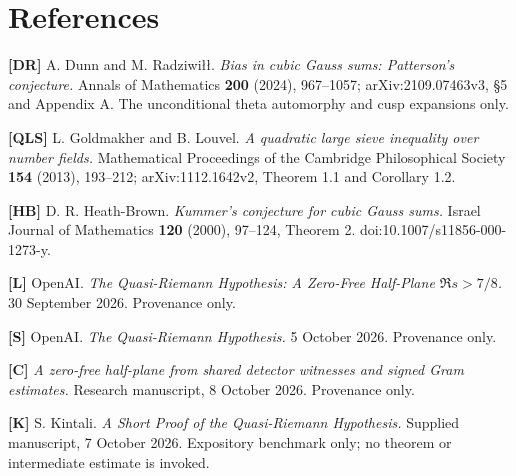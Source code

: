 \documentclass[11pt,a4paper]{article}
\begin{document}
\section*{References}

\hypertarget{bib:DR}{}\textbf{{[}DR{]}} A. Dunn and M. Radziwiłł. \emph{Bias in cubic Gauss sums: Patterson's conjecture.} Annals of Mathematics \textbf{200} (2024), 967--1057; arXiv:2109.07463v3, §5 and Appendix A. The unconditional theta automorphy and cusp expansions only.

\hypertarget{bib:QLS}{}\textbf{{[}QLS{]}} L. Goldmakher and B. Louvel. \emph{A quadratic large sieve inequality over number fields.} Mathematical Proceedings of the Cambridge Philosophical Society \textbf{154} (2013), 193--212; arXiv:1112.1642v2, Theorem 1.1 and Corollary 1.2.

\hypertarget{bib:HB}{}\textbf{{[}HB{]}} D. R. Heath-Brown. \emph{Kummer's conjecture for cubic Gauss sums.} Israel Journal of Mathematics \textbf{120} (2000), 97--124, Theorem 2. doi:10.1007/s11856-000-1273-y.

\hypertarget{bib:L}{}\textbf{{[}L{]}} OpenAI. \emph{The Quasi-Riemann Hypothesis: A Zero-Free Half-Plane \(\Re s>7/8\).} 30 September 2026. Provenance only.

\hypertarget{bib:S}{}\textbf{{[}S{]}} OpenAI. \emph{The Quasi-Riemann Hypothesis.} 5 October 2026. Provenance only.

\hypertarget{bib:C}{}\textbf{{[}C{]}} \emph{A zero-free half-plane from shared detector witnesses and signed Gram estimates.} Research manuscript, 8 October 2026. Provenance only.

\hypertarget{bib:K}{}\textbf{{[}K{]}} S. Kintali. \emph{A Short Proof of the Quasi-Riemann Hypothesis.} Supplied manuscript, 7 October 2026. Expository benchmark only; no theorem or intermediate estimate is invoked.
\end{document}

